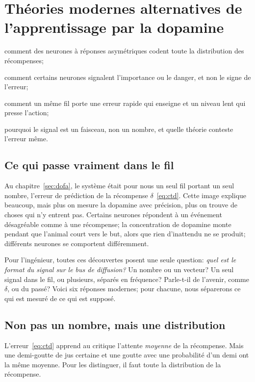 \chapter{Théories modernes alternatives de l'apprentissage par la dopamine}
\label{sec:dofaalt}
\begin{chaptergoals}
\item comment des neurones  à réponses asymétriques codent toute la distribution des récompenses;
\item comment certains neurones  signalent l'importance ou le danger, et non le signe de l'erreur;
\item comment un même fil porte une erreur rapide qui enseigne et un niveau lent qui presse l'action;
\item pourquoi le signal  est un faisceau, non un nombre, et quelle théorie conteste l'erreur même.
\end{chaptergoals}

\section{Ce qui passe vraiment dans le fil}

Au chapitre~\ref{sec:dofa}, le système  était pour nous un seul fil portant un seul nombre, l'erreur de prédiction de la récompense $\delta$~\eqref{eq:ctd}. Cette image explique beaucoup, mais plus on mesure la dopamine avec précision, plus on trouve de choses qui n'y entrent pas. Certains neurones répondent à un événement désagréable comme à une récompense; la concentration de dopamine monte pendant que l'animal court vers le but, alors que rien d'inattendu ne se produit; différents neurones  se comportent différemment.

Pour l'ingénieur, toutes ces découvertes posent une seule question: \emph{quel est le format du signal sur le bus de diffusion?} Un nombre ou un vecteur? Un seul signal dans le fil, ou plusieurs, séparés en fréquence? Parle-t-il de l'avenir, comme $\delta$, ou du passé? Voici six réponses modernes; pour chacune, nous séparerons ce qui est mesuré de ce qui est supposé.

\section{Non pas un nombre, mais une distribution}

L'erreur~\eqref{eq:ctd} apprend au critique l'attente \emph{moyenne} de la récompense. Mais une demi-goutte de jus certaine et une goutte avec une probabilité d'un demi ont la même moyenne. Pour les distinguer, il faut toute la distribution de la récompense.

